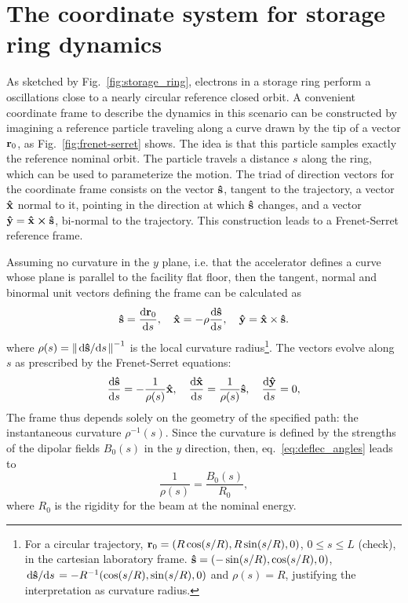 \section{The coordinate system for storage ring dynamics}
As sketched by Fig.~\ref{fig:storage_ring}, electrons in a storage ring perform a oscillations close to a nearly circular reference closed orbit. A convenient coordinate frame to describe the dynamics in this scenario can be constructed by imagining a reference particle traveling along a curve drawn by the tip of a vector $\vb{r}_0$, as Fig.~\ref{fig:frenet-serret} shows. The idea is that this particle samples exactly the reference nominal orbit. The particle travels a distance $s$ along the ring, which can be used to parameterize the motion. The triad of direction vectors for the coordinate frame consists on the vector $\vu{s}$, tangent to the trajectory, a vector $\vu{x}$ normal to it, pointing in the direction at which $\vu{s}$ changes, and a vector $\vu{y}=\vu{x}\cross\vu{s}$, bi-normal to the trajectory. This construction leads to a Frenet-Serret reference frame.

Assuming no curvature in the $y$ plane, i.e. that the accelerator defines a curve whose plane is parallel to the facility flat floor, then the tangent, normal and binormal unit vectors defining the frame can be calculated as \cite{lee_accelerator_2004}
\begin{equation}
\vu{s}=\dv{\vb{r}_{0}}{s}, \quad \vu{x}=-\rho\dv{\vu{s}}{s}, \quad \vu{y} =  \vu{x}\times\vu{s}.
\end{equation}
where $\rho(s) = \norm{\dv*{\vu{s}}{s}}^{-1}$ is the local curvature radius\footnote{For a circular trajectory, $\vb{r}_0 = (R\cos(s/R), R\sin(s/R), 0)$, $ 0\leq s \leq L$ (check), in the cartesian laboratory frame. $\vu{s}=(-\sin(s/R), \cos(s/R), 0)$, $\dv*{\vu{s}}{s} = -R^{-1}(\cos(s/R),\sin(s/R), 0 )$ and $\rho(s)=R$, justifying the interpretation as curvature radius.}. The vectors evolve along $s$ as prescribed by the Frenet-Serret equations:
\begin{equation}
\dv{\vu{s}}{s}=-\frac{1}{\rho(s)}\vu{x}, \quad\dv{\vu{x}}{s}=\frac{1}{\rho(s)}\vu{s}, \quad \dv{\vu{y}}{s}=0,
\end{equation}
The frame thus depends solely on the geometry of the specified path: the instantaneous curvature $\rho^{-1}(s)$. Since the curvature is defined by the strengths of the dipolar fields $B_0(s)$ in the $y$ direction, then, eq.~\eqref{eq:deflec_angles} leads to
    \begin{equation}
        \frac{1}{\rho(s)} = \frac{B_0(s)}{R_0},
        \label{eq:G}
    \end{equation}
where $R_0$ is the rigidity for the beam at the nominal energy.

